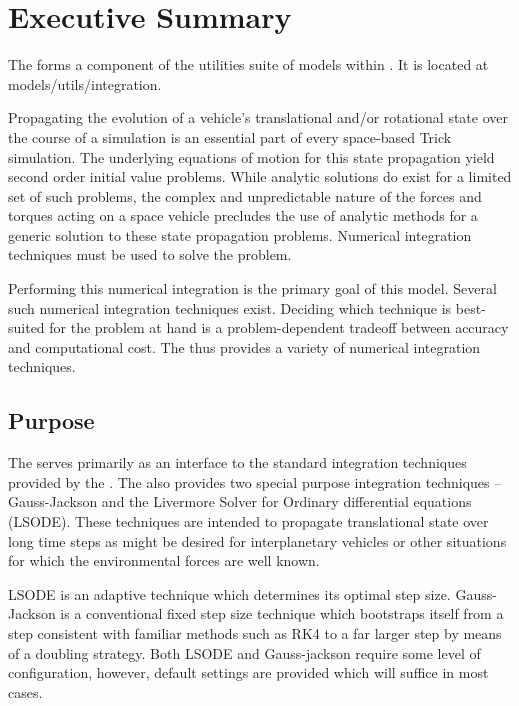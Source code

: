 %
%
%

\chapter*{Executive Summary}

The \ModelDesc forms a component of the utilities suite of
models within \JEODid. It is located at
models/utils/integration.

Propagating the evolution of a vehicle's translational and/or rotational
state over the course of a simulation is an essential part of every
space-based Trick simulation. The underlying equations of motion for this
state propagation yield second order initial value problems.
While analytic solutions do exist for a limited set of such problems,
the complex and unpredictable nature of the forces and torques acting on a
space vehicle precludes the use of analytic methods for a generic solution
to these state propagation problems. Numerical integration techniques
must be used to solve the problem.

Performing this numerical integration is the primary goal of this model.
Several such numerical integration techniques exist. Deciding which technique
is best-suited for the problem at hand is a problem-dependent tradeoff
between accuracy and computational cost. The \ModelDesc thus provides a
variety of numerical integration techniques.

\section*{Purpose}
The \ModelDesc serves primarily as an interface to the standard integration
techniques provided by the \erseven. The \ModelDesc also provides two special
purpose integration techniques -- Gauss-Jackson and the Livermore Solver for
Ordinary differential equations (LSODE). These techniques are intended to
propagate translational state over long time steps as might be
desired for interplanetary vehicles or other situations for which the
environmental forces are well known.

LSODE is an adaptive technique which determines its optimal step size.
Gauss-Jackson is a conventional fixed step size technique which
bootstraps itself from a step consistent with familiar methods such as RK4 to
a far larger step by means of a doubling strategy. Both LSODE and
Gauss-jackson require some level of configuration, however,
default settings are provided which will suffice in most cases.

